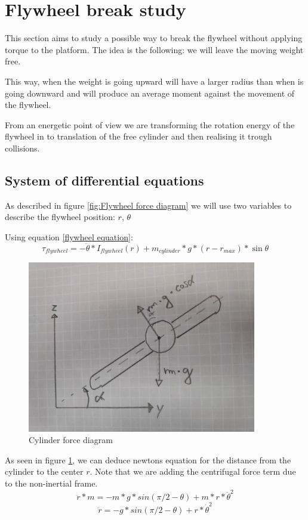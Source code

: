 \section{Flywheel break study}

This section aims to study a possible way to break the flywheel without applying torque to the platform. The idea is the following: we will leave the moving weight free.

This way, when the weight is going upward will have a larger radius than when is going downward and will produce an average moment against the movement of the flywheel.

From an energetic point of view we are transforming the rotation energy of the flywheel in to translation of the free cylinder and then realising it trough collisions.
\subsection{System of differential equations}
As described in figure \ref{fig:Flywheel force diagram} we will use two variables to describe the flywheel position: $r$, $\theta$ 

Using equation \ref{flywheel equation}:
\[\tau_{flywheel} = -\ddot{\theta}*I_{flywheel}(r) + m_{cylinder} * g * (r - r_{max}) * \sin{\theta}\]
\begin{figure}[ht]
	\centering
	\includegraphics[width=10cm]{img/cylinder_forces.png}
	\caption{Cylinder force diagram}
	\label{fig:Cylinder force diagram}
\end{figure}

As seen in figure \ref{fig:Cylinder force diagram}, we can deduce newtons equation for the distance from the cylinder to the center $r$. Note that we are adding the centrifugal force term due to the non-inertial frame.
\[\ddot{r} * m = -m * g * sin(\pi/2-\theta) + m * r * \dot{\theta}^2 \]
\[\ddot{r} = -g * sin(\pi/2-\theta) + r * \dot{\theta}^2 \]

